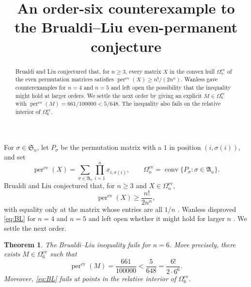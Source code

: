 \documentclass[11pt]{amsart}
\title[An order-six Brualdi--Liu counterexample]
{An order-six counterexample to the Brualdi--Liu even-permanent conjecture}
\date{}
\newcommand{\perev}{\operatorname{per}^{\mathrm{ev}}}
\newcommand{\Oev}{\Omega^{\mathrm{ev}}}
\newcommand{\Sn}{\mathfrak S}
\newcommand{\An}{\mathfrak A}
\newtheorem{theorem}{Theorem}
\begin{document}
\begin{abstract}
Brualdi and Liu conjectured that, for $n\ge 3$, every matrix $X$ in the convex
hull $\Oev_n$ of the even permutation matrices satisfies
$\perev(X)\ge n!/(2n^n)$. Wanless gave counterexamples for $n=4$ and
$n=5$ and left open the possibility that the inequality might hold at larger
orders. We settle the next order by giving an explicit $M\in\Oev_6$ with
$\perev(M)=661/100000<5/648$. The inequality also fails on the relative
interior of $\Oev_6$.
\end{abstract}

\maketitle

For $\sigma\in\Sn_n$, let $P_\sigma$ be the permutation matrix with a $1$ in
position $(i,\sigma(i))$, and set
\[
  \perev(X)=\sum_{\sigma\in\An_n}\prod_{i=1}^n x_{i,\sigma(i)},
  \qquad
  \Oev_n=\operatorname{conv}\{P_\sigma:\sigma\in\An_n\}.
\]
Brualdi and Liu conjectured that, for $n\ge 3$ and $X\in\Oev_n$,
\begin{equation}\label{eq:BL}
  \perev(X)\ge \frac{n!}{2n^n},
\end{equation}
with equality only at the matrix whose entries are all $1/n$
\cite[Conjecture~2]{BrualdiLiu}. Wanless disproved \eqref{eq:BL} for
$n=4$ and $n=5$ and left open whether it might hold for larger $n$
\cite{Wanless}. We settle the next order.

\begin{theorem}\label{thm:main}
The Brualdi--Liu inequality fails for $n=6$. More precisely, there exists
$M\in\Oev_6$ such that
\[
  \perev(M)=\frac{661}{100000}<\frac{5}{648}
  =\frac{6!}{2\cdot6^6}.
\]
Moreover, \eqref{eq:BL} fails at points in the relative interior of
$\Oev_6$.
\end{theorem}
\end{document}
